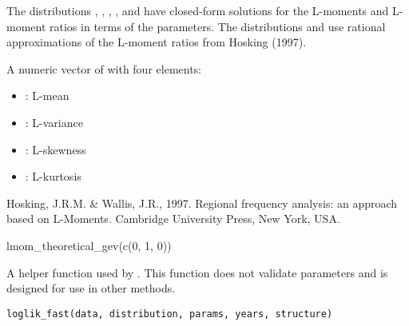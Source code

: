 \documentclass[a4paper]{book}
\begin{document}
%
\begin{Details}
The distributions , , , , and  have
closed-form solutions for the L-moments and L-moment ratios in terms of the parameters.
The distributions  and  use rational approximations of the L-moment ratios
from Hosking (1997).
\end{Details}
%
\begin{Value}
A numeric vector of with four elements:
\begin{itemize}

\item{} : L-mean
\item{} : L-variance
\item{} : L-skewness
\item{} : L-kurtosis

\end{itemize}

\end{Value}
%
\begin{References}
Hosking, J.R.M. \& Wallis, J.R., 1997. Regional frequency analysis: an approach based
on L-Moments. Cambridge University Press, New York, USA.
\end{References}
%
\begin{SeeAlso}
\end{SeeAlso}
%
\begin{Examples}
\begin{ExampleCode}
lmom_theoretical_gev(c(0, 1, 0))

\end{ExampleCode}
\end{Examples}
%
\begin{Description}
A helper function used by .
This function does not validate parameters and is designed for use in other methods.
\end{Description}
%
\begin{Usage}
\begin{verbatim}
loglik_fast(data, distribution, params, years, structure)
\end{verbatim}
\end{Usage}
%
\end{document}
